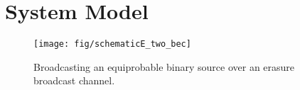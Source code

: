 \section{{}{System Model}}
\label{sec:system_model}


%
%



\begin{figure}
	\centering
%	
	\texttt{[image: fig/schematicE\_two\_bec]}
	\caption{Broadcasting an equiprobable binary source over an erasure broadcast channel.}
	\label{fig:schematic}
\end{figure}

